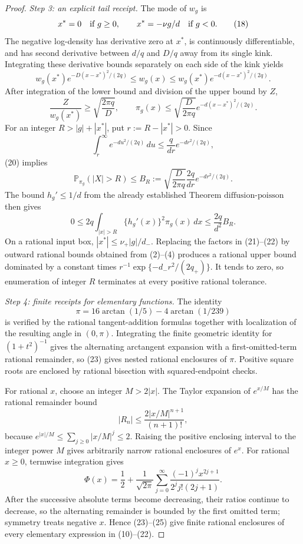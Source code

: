 \documentclass{article}
\begin{document}
\begin{proof}
\emph{Step 3: an explicit tail receipt.}
The mode of \(w_g\) is
\[
 x^*=0\quad\hbox{if }g\geq0,
 \qquad x^*=-\nu g/d\quad\hbox{if }g<0.
\tag{18}
\]
The negative log-density has derivative zero at \(x^*\), is continuously differentiable, and has second derivative between \(d/q\) and \(D/q\) away from its single kink.  Integrating these derivative bounds separately on each side of the kink yields
\[
 w_g(x^*)e^{-D(x-x^*)^2/(2q)}
 \leq w_g(x)
 \leq w_g(x^*)e^{-d(x-x^*)^2/(2q)}.
\tag{19}
\]
After integration of the lower bound and division of the upper bound by \(Z\),
\[
 \frac Z{w_g(x^*)}\geq\sqrt{\frac{2\pi q}{D}},
 \qquad
 \pi_g(x)\leq\sqrt{\frac D{2\pi q}}
 e^{-d(x-x^*)^2/(2q)}.
\tag{20}
\]
For an integer \(R>|g|+|x^*|\), put \(r:=R-|x^*|>0\).  Since
\[
 \int_r^\infty e^{-du^2/(2q)}\,du
 \leq\frac q{dr}e^{-dr^2/(2q)},
\]
(20) implies
\[
 \mathbb P_{\pi_g}(|X|>R)
 \leq B_R:=\sqrt{\frac D{2\pi q}}\frac{2q}{dr}
 e^{-dr^2/(2q)}.
\tag{21}
\]
The bound \(h_g'\leq1/d\) from the already established Theorem \(\mathrm{diffusion\mbox{-}poisson}\) then gives
\[
 0\leq2q\int_{|x|>R}\{h_g'(x)\}^2\pi_g(x)\,dx
 \leq\frac{2q}{d^2}B_R.
\tag{22}
\]
On a rational input box, \(|x^*|\leq\nu_+|g|/d_-\).  Replacing the factors in (21)--(22) by outward rational bounds obtained from (2)--(4) produces a rational upper bound dominated by a constant times \(r^{-1}\exp\{-d_-r^2/(2q_+)\}\).  It tends to zero, so enumeration of integer \(R\) terminates at every positive rational tolerance.

\emph{Step 4: finite receipts for elementary functions.}
The identity
\[
 \pi=16\arctan(1/5)-4\arctan(1/239)
\tag{23}
\]
is verified by the rational tangent-addition formulas together with localization of the resulting angle in \((0,\pi)\).  Integrating the finite geometric identity for \((1+t^2)^{-1}\) gives the alternating arctangent expansion with a first-omitted-term rational remainder, so (23) gives nested rational enclosures of \(\pi\).  Positive square roots are enclosed by rational bisection with squared-endpoint checks.

For rational \(x\), choose an integer \(M>2|x|\).  The Taylor expansion of \(e^{x/M}\) has the rational remainder bound
\[
 |R_n|\leq\frac{2|x/M|^{n+1}}{(n+1)!},
\tag{24}
\]
because \(e^{|x|/M}\leq\sum_{j\geq0}|x/M|^j\leq2\).  Raising the positive enclosing interval to the integer power \(M\) gives arbitrarily narrow rational enclosures of \(e^x\).  For rational \(x\geq0\), termwise integration gives
\[
 \Phi(x)=\frac12+\frac1{\sqrt{2\pi}}
 \sum_{j=0}^\infty\frac{(-1)^jx^{2j+1}}{2^j j!(2j+1)}.
\tag{25}
\]
After the successive absolute terms become decreasing, their ratios continue to decrease, so the alternating remainder is bounded by the first omitted term; symmetry treats negative \(x\).  Hence (23)--(25) give finite rational enclosures of every elementary expression in (10)--(22).


\end{proof}
\end{document}
